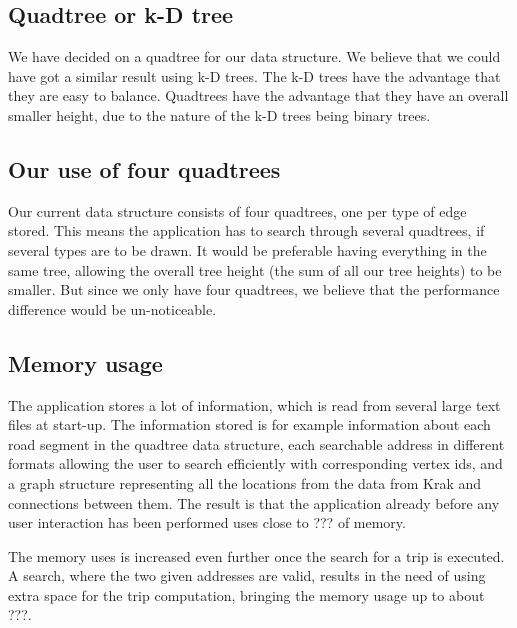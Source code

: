 \documentclass[a4paper,11pt]{article}
\begin{document}
\subsection{Quadtree or k-D tree}
We have decided on a quadtree for our data structure. We believe that we could have got a similar result using k-D trees. The k-D trees have the advantage that they are easy to balance. Quadtrees have the advantage that they have an overall smaller height, due to the nature of the k-D trees being binary trees.

\subsection{Our use of four quadtrees}
Our current data structure consists of four quadtrees, one per type of edge stored. This means the application has to search through several quadtrees, if several types are to be drawn. It would be preferable having everything in the same tree, allowing the overall tree height (the sum of all our tree heights) to be smaller. But since we only have four quadtrees, we believe that the performance difference would be un-noticeable.

\subsection{Memory usage}
The application stores a lot of information, which is read from several large text files at start-up. The information stored is for example information about each road segment in the quadtree data structure, each searchable address in different formats allowing the user to search efficiently with corresponding vertex ids, and a graph structure representing all the locations from the data from Krak and connections between them. The result is that the application already before any user interaction has been performed uses close to ??? of memory.

The memory uses is increased even further once the search for a trip is executed. A search, where the two given addresses are valid, results in the need of using extra space for the trip computation, bringing the memory usage up to about ???.
\end{document}
